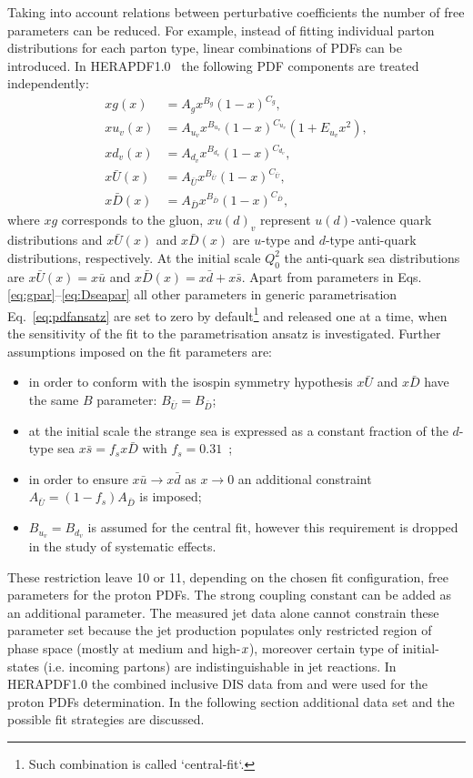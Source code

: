 Taking into account relations between perturbative coefficients the number of free parameters can be reduced. For example, instead of fitting individual parton distributions for each parton type, linear combinations of PDFs can be introduced.  In HERAPDF1.0~\cite{Aaron:2009aa} the following PDF components are treated independently:
\begin{align}
 xg\left(x\right) &= A_gx^{B_g}\left(1-x\right)^{C_g}, \label{eq:gpar} \\
 xu_v\left(x\right) &= A_{u_v}x^{B_{u_v}}\left(1-x\right)^{C_{u_v}}\left(1+E_{u_v}x^2\right),\\
 xd_v\left(x\right) &= A_{d_v}x^{B_{d_v}}\left(1-x\right)^{C_{d_v}},\\
 x\bar{U}\left(x\right) &= A_{\bar{U}}x^{B_{\bar{U}}}\left(1-x\right)^{C_{\bar{U}}},\\
 x\bar{D}\left(x\right) &= A_{\bar{D}}x^{B_{\bar{D}}}\left(1-x\right)^{C_{\bar{D}}}, \label{eq:Dseapar}
\end{align}
where $xg$ corresponds to the gluon, $xu\left(d\right)_v$ represent $u\left(d\right)$-valence quark distributions and $x\bar{U}\left(x\right)$ and $x\bar{D}\left(x\right)$ are $u$-type and $d$-type anti-quark distributions, respectively. At the initial scale $Q^2_0$ the anti-quark sea distributions are $x\bar{U}\left(x\right)=x\bar u$ and $x\bar{D}\left(x\right)=x\bar d+x\bar s$. Apart from parameters in Eqs.\eqref{eq:gpar}--\eqref{eq:Dseapar} all other parameters in generic parametrisation Eq.~\eqref{eq:pdfansatz} are set to zero by default\footnote{Such combination is called `central-fit`.} and released one at a time, when the sensitivity of the fit to the parametrisation ansatz is investigated. Further assumptions imposed on the fit parameters are:
\begin{itemize}
 \item in order to conform with the isospin symmetry hypothesis $x\bar{U}$ and $x\bar{D}$ have the same $B$ parameter: $B_{\bar{U}}=B_{\bar{D}}$;
 \item at the initial scale the strange sea is expressed as a constant fraction of the $d$-type sea $x\bar s=f_s x \bar D$ with $f_s=0.31$~\cite{Martin:2009iq,Nadolsky:2008zw};
 \item in order to ensure $x\bar u \rightarrow x\bar d$ as $x\rightarrow 0$ an additional constraint $A_{\bar U}=\left(1-f_s\right)A_{\bar D}$ is imposed;
 \item $B_{u_v}=B_{d_v}$ is assumed for the central fit, however this requirement is dropped in the study of systematic effects.
\end{itemize}
These restriction leave 10 or 11, depending on the chosen fit configuration, free parameters for the proton PDFs. The strong coupling constant \asz can be added as an additional parameter. The measured jet data alone cannot constrain these parameter set because the jet production populates only restricted region of phase space (mostly at medium and high-$\mbox{${x}$}$), moreover certain type of initial-states (i.e. incoming partons) are indistinguishable in jet reactions. In HERAPDF1.0 the combined inclusive DIS data from \hone and \zeus were used for the proton PDFs determination. In the following section additional data set and the possible fit strategies are discussed.
